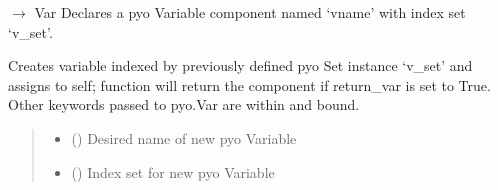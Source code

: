 \documentclass[letterpaper,10pt,english]{sphinxmanual}
\begin{document}
\begin{fulllineitems}
\begin{fulllineitems}
\label{\detokenize{src.common.model:src.common.model.Model.declare_var}}
\pysigstartsignatures
\pysiglinewithargsret
{}
{\sphinxparamcomma {}\sphinxparamcomma {}\sphinxparamcomma {}\sphinxparamcomma {}\sphinxparamcomma {}}
{{ $\rightarrow$ Var}}
\pysigstopsignatures
\sphinxAtStartPar
Declares a pyo Variable component named ‘vname’ with index set ‘v\_set’.

\sphinxAtStartPar
Creates variable indexed by previously defined pyo Set instance ‘v\_set’ and assigns to self;
function will return the component if return\_var is set to True. Other keywords passed to
pyo.Var are within and bound.
\begin{quote}\begin{description}
\begin{itemize}
\item {} 
\sphinxAtStartPar
{} () \textendash{} Desired name of new pyo Variable

\item {} 
\sphinxAtStartPar
{} () \textendash{} Index set for new pyo Variable


\end{itemize}
\end{description}
\end{quote}
\end{fulllineitems}
\end{fulllineitems}
\end{document}
